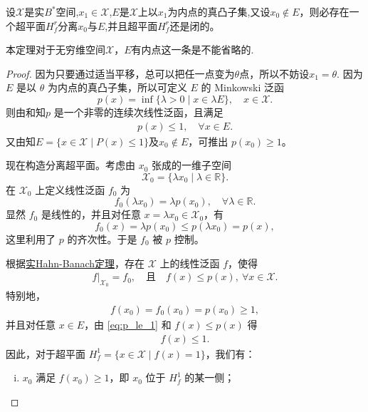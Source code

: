 \documentclass[../../main.tex]{subfiles}%
\begin{document}
\begin{theorem}\label{theorem:Hahn-Banach定理的几何形式}
设$\mathscr{X}$是实$B^*$空间,$x_1\in \mathscr{X}$,$E$是$\mathscr{X}$上以$x_1$为内点的真凸子集,又设$x_0 \notin E$，则必存在一个超平面$H_f^r$分离$x_0$与$E$,并且超平面$H_f^r$还是闭的。
\end{theorem}
\begin{remark}
本定理对于无穷维空间$\mathscr{X}$，$E$有内点这一条是不能省略的.
\end{remark}
\begin{proof}

因为只要通过适当平移，总可以把任一点变为$\theta$点，所以不妨设$x_1=\theta$.
因为 $E$ 是以 $\theta$ 为内点的真凸子集，所以可定义 $E$ 的 Minkowski 泛函
\[
p(x) = \inf\{\lambda > 0 \mid x \in \lambda E\}, \quad x \in \mathscr{X}.
\]
则由和知$p$ 是一个非零的连续次线性泛函，且满足
\begin{align}\label{eq:p_le_1}
p(x) \leqslant 1,\quad\forall x \in E.
\end{align}
又由知$E=\{x\in \mathscr{X}\mid P(x)\leqslant 1\}$及$x_0 \notin E$，可推出 $p(x_0) \geqslant 1$。

现在构造分离超平面。考虑由 $x_0$ 张成的一维子空间
\[
\mathscr{X}_0 = \{\lambda x_0 \mid \lambda \in \mathbb{R}\}.
\]
在 $\mathscr{X}_0$ 上定义线性泛函 $f_0$ 为
\[
f_0(\lambda x_0) = \lambda p(x_0), \quad \forall \lambda \in \mathbb{R}.
\]
显然 $f_0$ 是线性的，并且对任意 $x = \lambda x_0 \in \mathscr{X}_0$，有
\[
f_0(x) = \lambda p(x_0) \leqslant p(\lambda x_0) = p(x),
\]
这里利用了 $p$ 的齐次性。于是 $f_0$ 被 $p$ 控制。

根据\hyperref[theorem:泛函分析--实Hahn-Banach定理]{实Hahn-Banach定理}，存在 $\mathscr{X}$ 上的线性泛函 $f$，使得
\begin{align}
f|_{\mathscr{X}_0} = f_0, \quad \text{且} \quad f(x) \leqslant p(x),\ \forall x \in \mathscr{X}.\label{eq::FHJOIWJ421423}
\end{align}
特别地，
\begin{align}\label{eq:f_x0}
f(x_0) = f_0(x_0) = p(x_0) \geqslant 1,
\end{align}
并且对任意 $x \in E$，由 \eqref{eq:p_le_1} 和 $f(x) \leqslant p(x)$ 得
\begin{align}\label{eq:f_E}
f(x) \leqslant 1.
\end{align}
因此，对于超平面 $H_f^1 = \{x \in \mathscr{X} \mid f(x) = 1\}$，我们有：
\begin{enumerate}[(i)]
\item $x_0$ 满足 $f(x_0) \geqslant 1$，即 $x_0$ 位于 $H_f^1$ 的某一侧；


\end{enumerate}
\end{proof}
\end{document}
